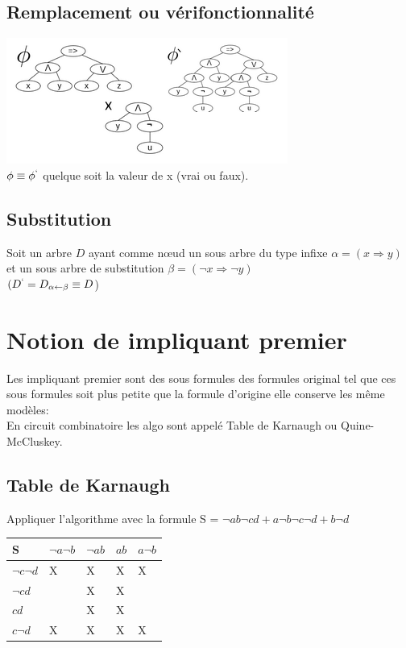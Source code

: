 \subsection{Remplacement ou vérifonctionnalité}
\includegraphics[scale=0.8]{img/of-remplacement.png} \\

$\phi \equiv \phi^{`}$ quelque soit la valeur de x (vrai ou faux).

\subsection{Substitution}
Soit un arbre $D$ ayant comme nœud un sous arbre du type infixe $\alpha = (x \Rightarrow y)$ et un sous arbre de substitution $\beta = (\neg x \Rightarrow \neg y)$\\
$(D^{`} = D_{\alpha \leftarrow \beta} \equiv D$)\\

\section{Notion de impliquant premier }
Les impliquant premier sont des sous formules des formules original tel que ces sous formules soit plus petite que la formule d'origine elle conserve les même modèles:\\
En circuit combinatoire les algo sont appelé  Table de Karnaugh ou Quine-McCluskey.

\subsection{Table de Karnaugh}
Appliquer l'algorithme avec la formule S = $\neg a b \neg c d + a \neg b \neg c \neg d + b \neg d$\\

\begin{tabular}{l|l|l|l|l}
  \hline
  S & $\neg a \neg b$ & $\neg a b$ & $ab$ & $a \neg b$\\
  \hline
  $\neg c \neg d$ & X & X & X & X \\
  $ \neg c d $ & $ $ & X & X & $ $ \\
  $cd$ & $ $ & X & X & $ $ \\
  $c \neg d$ & X & X & X & X \\
  \hline
\end{tabular}\\

